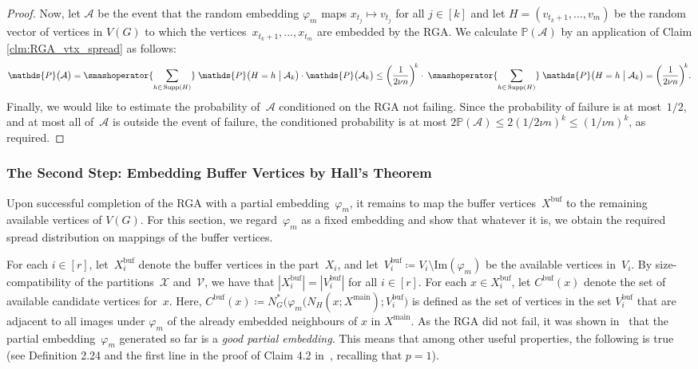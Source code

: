 \documentclass[final]{article}
\def\mcite[#1]#2{\mbox{\cite[#1]{#2}}}
\theoremstyle{definition}
\newcommand{\main}{\mathrm{main}}
\newcommand{\buf}{\mathrm{buf}}
\newcommand{\im}{\mathrm{Im}}
\DeclareMathOperator{\supp}{Supp}
\begin{document}
\begin{proof}
    Now, let $\mathcal{A}$ be the event that the random embedding $\varphi_m$ maps $x_{t_j} \mapsto v_{t_j}$ for all $j \in [k]$ and let $H = (v_{t_{k}+1}, \dots, v_m)$ be the random vector of vertices in $V(G)$ to which the vertices~$x_{t_k+1}, \dots, x_{t_m}$ are embedded by the RGA. We calculate $\mathds{P}(\mathcal{A})$ by an application of Claim \ref{clm:RGA_vtx_spread} as follows:
    \[\mathds{P}\bigl(\mathcal{A}\bigr) = \smashoperator{\sum_{h \in\, \supp(H)}}\;\mathds{P}\bigl(H = h \bigm| \mathcal{A}_k \bigr)\cdot \mathds{P}\bigl(\mathcal{A}_k\bigr) \leq \biggl(\frac{1}{2\nu n}\biggr)^{\!k}\cdot\; \smashoperator{\sum_{h \in \, \supp(H)}}\;\mathds{P}\bigl(H = h \bigm| \mathcal{A}_{k}\bigr) = \biggl(\frac{1}{2\nu n}\biggr)^{\!k}.\]
    \indent Finally, we would like to estimate the probability of~$\mathcal{A}$ conditioned on the RGA not failing. Since the probability of failure is at most~$1/2$, and at most all of~$\mathcal{A}$ is outside the event of failure, the conditioned probability is at most $2\mathds{P}(\mathcal{A})\le2({1}/{2\nu n})^{k}\le({1}/{\nu n})^{k}$, as required.
    \end{proof}

\subsubsection*{The Second Step: Embedding Buffer Vertices by Hall's Theorem} 

Upon successful completion of the RGA with a partial embedding~$\varphi_m$, it remains to map the buffer vertices~$X^{\buf}$ to the remaining available vertices of $V(G)$. For this section, we regard~$\varphi_m$ as a fixed embedding and show that whatever it is, we obtain the required spread distribution on mappings of the buffer vertices.

For each $i \in [r]$, let~$X_i^{\buf}$ denote the buffer vertices in the part~$X_i$, and let~$V_i^{\buf} \coloneqq V_i \setminus \im(\varphi_{m})$ be the available vertices in~$V_i$. By size-compatibility of the partitions~$\mathcal{X}$ and~$\mathcal{V}$, we have that $|X^{\buf}_i| = |V^{\buf}_i|$ for all $i \in [r]$. For each $x \in X^{\buf}_i$, let $C^{\buf}(x)$ denote the set of available candidate vertices for~$x$. Here, $C^{\buf}(x)  \coloneqq N^*_G\bigl(\varphi_m(N_H(x; X^{\main}); V_i^{\buf}\bigr)$ is defined as the set of vertices in the set $V^{\buf}_i$ that are adjacent to all images under $\varphi_m$ of the already embedded neighbours of $x$ in $X^{\main}$. As the RGA did not fail, it was shown in~\mcite[Lemma 4.1]{sparse_blowup} that the partial embedding~$\varphi_m$ generated so far is a \emph{good partial embedding}. This means that among other useful properties, the following is true (see Definition 2.24 and the first line in the proof of Claim 4.2 in~\cite{sparse_blowup}, recalling that $p=1$).
\end{document}

